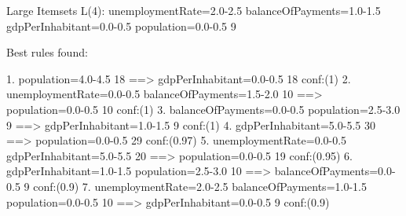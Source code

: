 Large Itemsets L(4):
unemploymentRate=2.0-2.5 balanceOfPayments=1.0-1.5 gdpPerInhabitant=0.0-0.5 population=0.0-0.5 9

Best rules found:

 1. population=4.0-4.5 18 ==> gdpPerInhabitant=0.0-0.5 18    conf:(1)
 2. unemploymentRate=0.0-0.5 balanceOfPayments=1.5-2.0 10 ==> population=0.0-0.5 10    conf:(1)
 3. balanceOfPayments=0.0-0.5 population=2.5-3.0 9 ==> gdpPerInhabitant=1.0-1.5 9    conf:(1)
 4. gdpPerInhabitant=5.0-5.5 30 ==> population=0.0-0.5 29    conf:(0.97)
 5. unemploymentRate=0.0-0.5 gdpPerInhabitant=5.0-5.5 20 ==> population=0.0-0.5 19    conf:(0.95)
 6. gdpPerInhabitant=1.0-1.5 population=2.5-3.0 10 ==> balanceOfPayments=0.0-0.5 9    conf:(0.9)
 7. unemploymentRate=2.0-2.5 balanceOfPayments=1.0-1.5 population=0.0-0.5 10 ==> gdpPerInhabitant=0.0-0.5 9    conf:(0.9)
